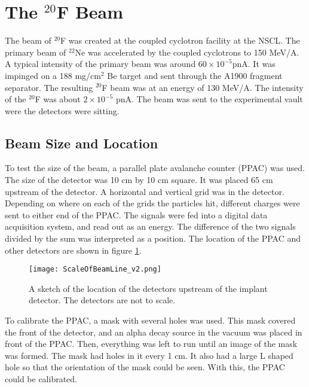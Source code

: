 \documentclass[../MaxHughesThesis.tex]{subfiles}
\begin{document}
\section{The $^{20}$F Beam}

The beam of $^{20}$F was created at the coupled cyclotron facility at the NSCL.
The primary beam of $^{22}$Ne was accelerated by the coupled cyclotrons to 150 MeV/A. 
A typical intensity of the primary beam was around $60 \times 10^{-5}$pnA.
It was impinged on a 188 mg/cm$^{2}$ Be target and sent through the A1900 fragment separator. 
The resulting $^{20}$F beam was at an energy of 130 MeV/A. 
The intensity of the $^{20}$F was about $2 \times 10^{-5}$ pnA.
The beam was sent to the experimental vault were the detectors were sitting.

\subsection{Beam Size and Location}
\label{sec:beamsize}
To test the size of the beam, a parallel plate avalanche counter (PPAC) was used.
The size of the detector was 10 cm by 10 cm square. 
It was placed 65 cm upstream of the detector.
A horizontal and vertical grid was in the detector.
Depending on where on each of the grids the particles hit, different charges were sent to either end of the PPAC.
The signals were fed into a digital data acquisition system, and read out as an energy.
The difference of the two signals divided by the sum was interpreted as a position.
The location of the PPAC and other detectors are shown in figure \ref{fig:BeamSetUp}.

\begin{figure}
	\centerline{\texttt{[image: ScaleOfBeamLine\_v2.png]}}
	\caption{A sketch of the location of the detectors upstream of the implant detector.
		    The detectors are not to scale. 
			}
	\label{fig:BeamSetUp}
\end{figure}  

To calibrate the PPAC, a mask with several holes was used. 
This mask covered the front of the detector, and an alpha decay source in the vacuum was placed in front of the PPAC.
Then, everything was left to run until an image of the mask was formed.
The mask had holes in it every 1 cm. 
It also had a large L shaped hole so that the orientation of the mask could be seen. 
With this, the PPAC could be calibrated.
\end{document}
